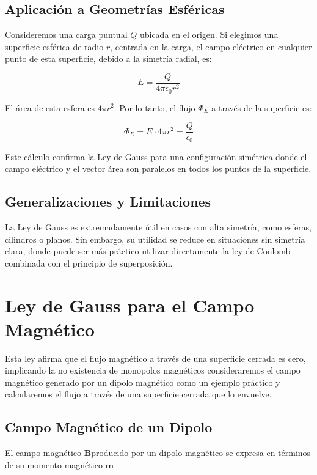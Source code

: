 \documentclass{article}
\begin{document}
	\subsection{Aplicación a Geometrías Esféricas}
	
	Consideremos una carga puntual $Q$ ubicada en el origen. Si elegimos una superficie esférica de radio $r$, centrada en la carga, el campo eléctrico en cualquier punto de esta superficie, debido a la simetría radial, es:
	
	\begin{equation}
		E = \frac{Q}{4\pi \epsilon_0 r^2}
	\end{equation}
	
	El área de esta esfera es $4\pi r^2$. Por lo tanto, el flujo $\Phi_E$ a través de la superficie es:
	
	\begin{equation}
		\Phi_E = E \cdot 4\pi r^2 = \frac{Q}{\epsilon_0}
	\end{equation}
	
	Este cálculo confirma la Ley de Gauss para una configuración simétrica donde el campo eléctrico y el vector área son paralelos en todos los puntos de la superficie.
	
	\subsection{Generalizaciones y Limitaciones}
	
	La Ley de Gauss es extremadamente útil en casos con alta simetría, como esferas, cilindros o planos. Sin embargo, su utilidad se reduce en situaciones sin simetría clara, donde puede ser más práctico utilizar directamente la ley de Coulomb combinada con el principio de superposición.
	
	\section{Ley de Gauss para el Campo Magnético}
	Esta ley afirma que el flujo magnético a través de una superficie cerrada es cero, implicando la no existencia de monopolos magnéticos
	consideraremos el campo magnético generado por un dipolo magnético como un ejemplo práctico y calcularemos el flujo a través de una superficie cerrada que lo envuelve.
	
	\subsection{Campo Magnético de un Dipolo}
	El campo magnético \(\mathbf{B}\)producido por un dipolo magnético se expresa en términos de su momento magnético \(\mathbf{m}\)
	
\end{document}
